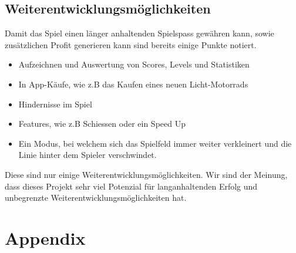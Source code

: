 \documentclass[11pt,ngerman]{article}
\begin{document}
    \subsection{Weiterentwicklungsmöglichkeiten}

    Damit das Spiel einen länger anhaltenden Spielspass gewähren kann, sowie zusätzlichen Profit generieren kann sind bereits einige Punkte notiert.

    \begin{itemize}
	    \item Aufzeichnen und Auswertung von Scores, Levels und Statistiken
	    \item In App-Käufe, wie z.B das Kaufen eines neuen Licht-Motorrads
	    \item Hindernisse im Spiel
	    \item Features, wie z.B Schiessen oder ein Speed Up
		\item Ein Modus, bei welchem sich das Spielfeld immer weiter verkleinert und die Linie hinter dem Spieler verschwindet.
	\end{itemize}

	Diese sind nur einige Weiterentwicklungsmöglichkeiten. Wir sind der Meinung, dass dieses Projekt sehr viel Potenzial für langanhaltenden Erfolg und unbegrenzte Weiterentwicklungsmöglichkeiten hat.

    \section{Appendix}
\end{document}
